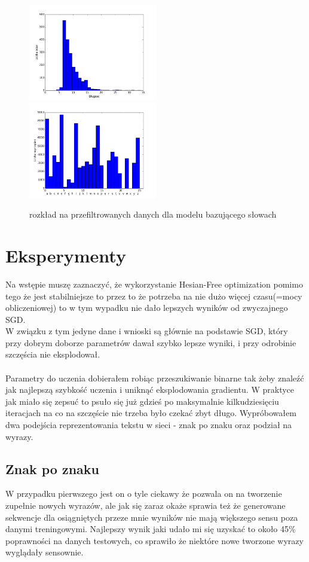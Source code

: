 \documentclass[11pt,leqno]{article}
\begin{document}
\begin{figure}[!h]
    \includegraphics[width=0.5\textwidth]{pictures/word_filtered_length_distribution.png}
    \includegraphics[width=0.5\textwidth]{pictures/word_filtered_letters_distribution.png}
    \caption{rozkład na przefiltrowanych danych dla modelu bazującego słowach}
\end{figure}

\section{Eksperymenty}
Na wstępie muszę zaznaczyć, że wykorzystanie Hesian-Free optimization pomimo tego że jest stabilniejsze to przez to że potrzeba na nie dużo więcej czasu(=mocy obliczeniowej) to w tym wypadku nie dało lepszych wyników od zwyczajnego SGD. \\
W związku z tym jedyne dane i wnioski są głównie na podstawie SGD, który przy dobrym doborze parametrów dawał szybko lepsze wyniki, i przy odrobinie szczęścia nie eksplodował. \\\\
Parametry do uczenia dobierałem robiąc przeszukiwanie binarne tak żeby znaleźć jak najlepszą szybkość uczenia i uniknąć eksplodowania gradientu. W praktyce jak miało się zepsuć to psuło się już gdzieś po maksymalnie kilkudziesięciu iteracjach na co na szczęście nie trzeba było czekać zbyt długo.
Wypróbowałem dwa podejścia reprezentowania tekstu w sieci - znak po znaku oraz podział na wyrazy.

\subsection{Znak po znaku}
W przypadku pierwszego jest on o tyle ciekawy że pozwala on na tworzenie zupełnie nowych wyrazów, ale jak się zaraz okaże sprawia też że generowane sekwencje dla osiągniętych przeze mnie wyników nie mają większego sensu poza danymi treningowymi.
Najlepszy wynik jaki udało mi się uzyskać to około 45\% poprawności na danych testowych, co sprawiło że niektóre nowe tworzone wyrazy wyglądały sensownie.
\end{document}
